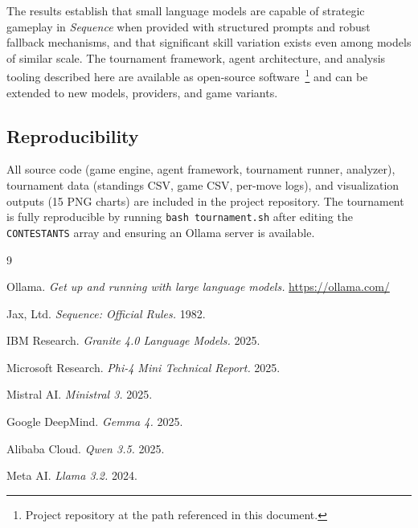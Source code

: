 \documentclass[11pt]{article}
\begin{document}
The results establish that small language models are capable of strategic gameplay in \textit{Sequence} when provided with structured prompts and robust fallback mechanisms, and that significant skill variation exists even among models of similar scale. The tournament framework, agent architecture, and analysis tooling described here are available as open-source software~\footnote{Project repository at the path referenced in this document.} and can be extended to new models, providers, and game variants.

\subsection*{Reproducibility}

All source code (game engine, agent framework, tournament runner, analyzer), tournament data (standings CSV, game CSV, per-move logs), and visualization outputs (15 PNG charts) are included in the project repository. The tournament is fully reproducible by running \texttt{bash tournament.sh} after editing the \texttt{CONTESTANTS} array and ensuring an Ollama server is available.


\begin{thebibliography}{9}

Ollama. \textit{Get up and running with large language models.} \url{https://ollama.com/}

Jax, Ltd. \textit{Sequence: Official Rules.} 1982.

IBM Research. \textit{Granite 4.0 Language Models.} 2025.

Microsoft Research. \textit{Phi-4 Mini Technical Report.} 2025.

Mistral AI. \textit{Ministral 3.} 2025.

Google DeepMind. \textit{Gemma 4.} 2025.

Alibaba Cloud. \textit{Qwen 3.5.} 2025.

Meta AI. \textit{Llama 3.2.} 2024.

\end{thebibliography}
\end{document}
